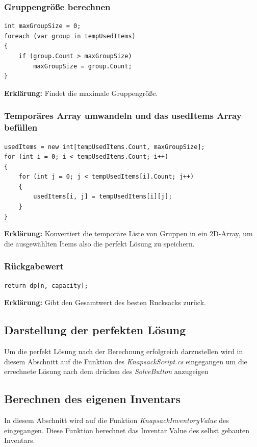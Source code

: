 \subsubsection{Gruppengröße berechnen}
\begin{lstlisting}[style=csharp, caption={}, label=code:maxgroup]
int maxGroupSize = 0;
foreach (var group in tempUsedItems)
{
    if (group.Count > maxGroupSize)
        maxGroupSize = group.Count;
}
\end{lstlisting}
\textbf{Erklärung:} Findet die maximale Gruppengröße.\\

\subsubsection{Temporäres Array umwandeln und das usedItems Array befüllen}
\begin{lstlisting}[style=csharp, caption={}, label=code:convert]
usedItems = new int[tempUsedItems.Count, maxGroupSize];
for (int i = 0; i < tempUsedItems.Count; i++)
{
    for (int j = 0; j < tempUsedItems[i].Count; j++)
    {
        usedItems[i, j] = tempUsedItems[i][j];
    }
}
\end{lstlisting}
\textbf{Erklärung:} Konvertiert die temporäre Liste von Gruppen in ein 2D-Array, um die ausgewählten Items also die perfekt Lösung zu speichern.\\

\subsubsection{Rückgabewert}
\begin{lstlisting}[style=csharp, caption={}, label=code:return]
return dp[n, capacity];
\end{lstlisting}
\textbf{Erklärung:} Gibt den Gesamtwert des besten Rucksacks zurück.\\

\subsection{Darstellung der perfekten Lösung}
Um die perfekt Lösung nach der Berechnung erfolgreich darzustellen wird in diesem Abschnitt auf die  Funktion des
\textit{KnapsackScript.cs} eingegangen um die errechnete Lösung nach dem drücken des \textit{SolveButton} anzugeigen

\subsection{Berechnen des eigenen Inventars}
In diesem Abschnitt wird auf die Funktion \textit{KnapsackInventoryValue} des  eingegangen. Diese Funktion
berechnet das Inventar Value des selbst gebauten Inventars.

